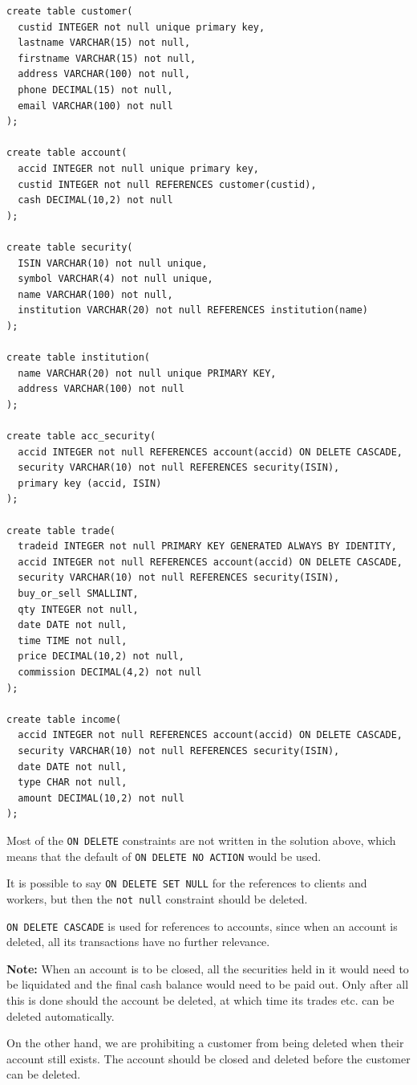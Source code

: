 \begin{verbatim}
create table customer(
  custid INTEGER not null unique primary key,
  lastname VARCHAR(15) not null,
  firstname VARCHAR(15) not null,
  address VARCHAR(100) not null,
  phone DECIMAL(15) not null,
  email VARCHAR(100) not null
);

create table account(
  accid INTEGER not null unique primary key,
  custid INTEGER not null REFERENCES customer(custid),
  cash DECIMAL(10,2) not null
);

create table security(
  ISIN VARCHAR(10) not null unique,
  symbol VARCHAR(4) not null unique,
  name VARCHAR(100) not null,
  institution VARCHAR(20) not null REFERENCES institution(name)
);

create table institution(
  name VARCHAR(20) not null unique PRIMARY KEY,
  address VARCHAR(100) not null
);

create table acc_security(
  accid INTEGER not null REFERENCES account(accid) ON DELETE CASCADE,
  security VARCHAR(10) not null REFERENCES security(ISIN),
  primary key (accid, ISIN)
);

create table trade(
  tradeid INTEGER not null PRIMARY KEY GENERATED ALWAYS BY IDENTITY,
  accid INTEGER not null REFERENCES account(accid) ON DELETE CASCADE,
  security VARCHAR(10) not null REFERENCES security(ISIN),
  buy_or_sell SMALLINT,
  qty INTEGER not null,
  date DATE not null,
  time TIME not null,
  price DECIMAL(10,2) not null,
  commission DECIMAL(4,2) not null
);

create table income(
  accid INTEGER not null REFERENCES account(accid) ON DELETE CASCADE,
  security VARCHAR(10) not null REFERENCES security(ISIN),
  date DATE not null,
  type CHAR not null,
  amount DECIMAL(10,2) not null
);
\end{verbatim}

Most of the \texttt{ON DELETE} constraints are not written in the solution above, which means that the default of \texttt{ON DELETE NO ACTION} would be used.

It is possible to say \texttt{ON DELETE SET NULL} for the references to clients and workers, but then the \texttt{not null} constraint should be deleted.

\texttt{ON DELETE CASCADE} is used for references to accounts, since when an account is deleted, all its transactions have no further relevance.

\textbf{Note:} When an account is to be closed, all the securities held in it would need to be liquidated and the final cash balance would need to be paid out. Only after all this is done should the account be deleted, at which time its trades etc. can be deleted automatically.

On the other hand, we are prohibiting a customer from being deleted when their account still exists. The account should be closed and deleted before the customer can be deleted.

